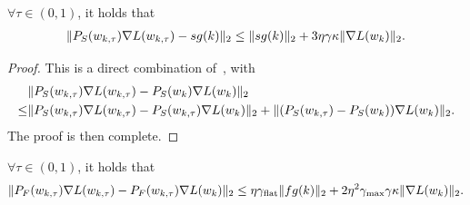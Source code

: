     \begin{lemma}
    \label{lem:movegps}
        $\forall \tau \in (0, 1)$, it holds that 
        \begin{align*}
            \|  {P}_S(w_{k, \tau}) \nabla L(w_{k, \tau}) -sg(k) \|_2 \le  \|  sg(k) \|_2 + 3\eta  \gamma \kappa \| \nabla L(w_k)\|_2.
        \end{align*}
    \end{lemma}

    \begin{proof}
        This is a direct combination of~, with
        \begin{align*}
            &\|  {P}_S(w_{k, \tau}) \nabla L(w_{k, \tau}) - {P}_S(w_k) \nabla L(w_k) \|_2 \\
            \le& \|  {P}_S(w_{k, \tau}) \nabla L(w_{k, \tau}) - {P}_S(w_{k, \tau}) \nabla L(w_k) \|_2  + \| ({P}_S(w_{k, \tau}) - {P}_S(w_k)) \nabla L(w_k) \|_2.
        \end{align*}
        The proof is then complete.
    \end{proof}

    
    \begin{lemma}
    \label{lem:movepfg}
        $\forall \tau \in (0, 1)$, it holds that 
        \begin{align*}
            \|  {P}_F(w_{k, \tau}) \nabla L(w_{k, \tau}) - {P}_F(w_{k, \tau}) \nabla L(w_k) \|_2 \le \eta \gamma_{\mathrm{flat}} \|  fg(k) \|_2 + 2\eta^2 \gamma_{\mathrm{max}} \gamma \kappa \| \nabla L(w_k)\|_2.
        \end{align*}
    \end{lemma}

